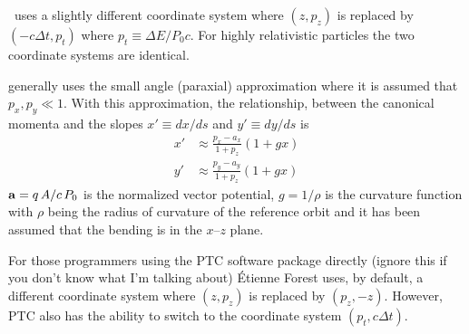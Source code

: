 \mad\ uses a slightly different coordinate system where $(z, p_z)$ is
replaced by $(-c\Delta t, p_t)$ where $p_t \equiv \Delta E / P_0
c$. For highly relativistic particles the two coordinate systems are
identical.

\bmad generally uses the small angle (paraxial) approximation
where it is assumed that $p_x, p_y \ll 1$. With this approximation, the
relationship, between the canonical momenta and the slopes $x' \equiv dx/ds$
and $y' \equiv dy/ds$ is
\begin{align}
  x' &\approx \frac{p_x - a_x}{1 + p_z} (1 + g x) \\
  y' &\approx \frac{p_y - a_y}{1 + p_z} (1 + g x) 
\end{align}
${\bf a} = q \, A / c \, P_0$ is the normalized vector potential, $g =
1/\rho$ is the curvature function with $\rho$ being the radius of
curvature of the reference orbit and it has been assumed that the
bending is in the $x$--$z$ plane. 

For those programmers using the PTC
software package directly (ignore
this if you don't know what I'm talking about) \'Etienne Forest uses,
by default, a different coordinate system where $(z, p_z)$ is replaced
by $(p_z, -z)$. However, PTC also has the ability to switch to the
coordinate system $(p_t, c \Delta t)$.